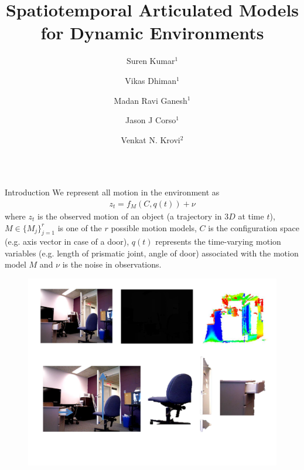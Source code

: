 \documentclass[final]{beamer}
\title{Spatiotemporal Articulated Models for Dynamic Environments}
\author{Suren Kumar$^1$ \and Vikas Dhiman$^1$ \and Madan Ravi Ganesh$^1$ \and Jason J Corso$^1$ \and Venkat
N. Krovi$^2$}
\institute{$^1$ University of Michigan \hspace{1in} $^2$ University at Buffalo}
\newlength{\sepwid}
\newlength{\onecolwid}
\begin{document}
\begin{frame}[t]
  \centering
  \begin{columns}[t]												%
  \hspace{-\sepwid}
    \begin{column}{\onecolwid}
      \begin{block}{Introduction}
	      We represent all motion in the environment as
	      \begin{align}
z_t = f_M(C,q(t)) + \nu \label{eq:articulated_model_representation}
\end{align}
where $z_t$ is the observed motion of an object (a trajectory in $3D$ at time
$t$), $M \in \{M_j\}_{j=1}^r$ is one of the $r$ possible motion models, $C$ is
the configuration space (e.g. axis vector in case of a door), $q(t)$ represents
the time-varying motion variables (e.g. length of prismatic joint, angle of
door) associated with the motion model $M$ and $\nu$ is the noise in
observations.

        \begin{figure}
          \includegraphics[width=\onecolwid,trim=0 1in 0 3in,clip]{media/parts_of_scenes}
        \end{figure}
      \end{block}


\end{column}
\end{columns}
\end{frame}
\end{document}
